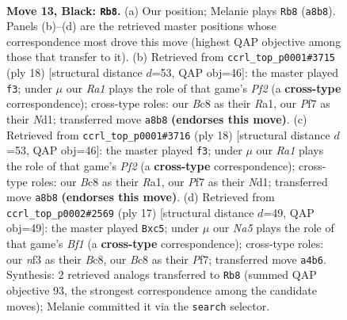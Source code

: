 \documentclass[11pt]{article}
\begin{document}
\clearpage

\begin{figure}[p]\centering
\begin{subfigure}{0.46\textwidth}\centering
\resizebox{\linewidth}{!}{%
\newchessgame
\chessboard[
  setfen={r1b1kb1r/1p3ppp/p1n1p3/4P3/n7/4BNP1/PP3P1P/RNK2B1R b kq - 3 13},
  showmover=false,
  pgfstyle=straightmove, color=movearrow, markmove={a8-b8}
]}
\caption{}
\end{subfigure}\hfill
\begin{subfigure}{0.46\textwidth}\centering
\resizebox{\linewidth}{!}{%
\newchessgame
\chessboard[
  setfen={rnb1kb1r/p4ppp/2p2n2/8/PppNP3/8/1P3PPP/R1BNKB1R w KQkq - 2 10},
  showmover=false,
  pgfstyle=straightmove, color=movearrow, markmove={f2-f3}
]}
\caption{}
\end{subfigure}
\\[4pt]
\begin{subfigure}{0.46\textwidth}\centering
\resizebox{\linewidth}{!}{%
\newchessgame
\chessboard[
  setfen={rnb1kb1r/p4ppp/2p2n2/8/PppNP3/8/1P3PPP/R1BNKB1R w KQkq - 2 10},
  showmover=false,
  pgfstyle=straightmove, color=movearrow, markmove={f2-f3}
]}
\caption{}
\end{subfigure}\hfill
\begin{subfigure}{0.46\textwidth}\centering
\resizebox{\linewidth}{!}{%
\newchessgame
\chessboard[
  setfen={r1b1kb1r/1p3ppp/p1n1pn2/2P5/2B5/4PN1P/PP3PP1/RNBR2K1 b kq - 0 9},
  showmover=false,
  pgfstyle=straightmove, color=movearrow, markmove={f8-c5}
]}
\caption{}
\end{subfigure}
\caption{\textbf{Move 13, Black: \texttt{Rb8}.} (a) Our position; Melanie plays \texttt{Rb8} (\texttt{a8b8}). Panels (b)--(d) are the retrieved master positions whose correspondence most drove this move (highest QAP objective among those that transfer to it). (b) Retrieved from \texttt{ccrl\_top\_p0001\#3715} (ply 18) [structural distance $d$=53, QAP obj=46]: the master played \texttt{f3}; under $\mu$ our \emph{Ra1} plays the role of that game's \emph{Pf2} (a \textbf{cross-type} correspondence); cross-type roles: our \emph{B}c8 as their \emph{R}a1, our \emph{P}f7 as their \emph{N}d1; transferred move \texttt{a8b8} \textbf{(endorses this move)}. (c) Retrieved from \texttt{ccrl\_top\_p0001\#3716} (ply 18) [structural distance $d$=53, QAP obj=46]: the master played \texttt{f3}; under $\mu$ our \emph{Ra1} plays the role of that game's \emph{Pf2} (a \textbf{cross-type} correspondence); cross-type roles: our \emph{B}c8 as their \emph{R}a1, our \emph{P}f7 as their \emph{N}d1; transferred move \texttt{a8b8} \textbf{(endorses this move)}. (d) Retrieved from \texttt{ccrl\_top\_p0002\#2569} (ply 17) [structural distance $d$=49, QAP obj=49]: the master played \texttt{Bxc5}; under $\mu$ our \emph{Na5} plays the role of that game's \emph{Bf1} (a \textbf{cross-type} correspondence); cross-type roles: our \emph{n}f3 as their \emph{B}c8, our \emph{B}c8 as their \emph{P}f7; transferred move \texttt{a4b6}. Synthesis: 2 retrieved analogs transferred to \texttt{Rb8} (summed QAP objective 93, the strongest correspondence among the candidate moves); Melanie committed it via the \texttt{search} selector.}
\label{fig:thought-m25}
\end{figure}
\end{document}
